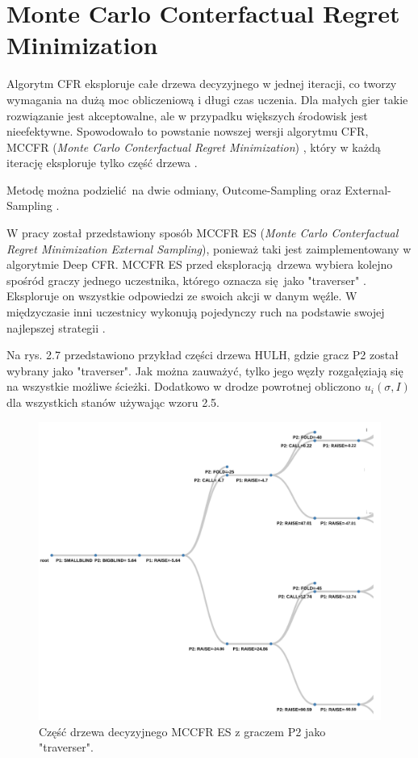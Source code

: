 \documentclass[12pt,oneside,a4paper]{report}
\begin{document}
\section{Monte Carlo Conterfactual Regret Minimization}

Algorytm CFR eksploruje całe drzewa decyzyjnego w jednej iteracji, co tworzy wymagania na
dużą moc obliczeniową i długi czas uczenia. Dla małych gier takie rozwiązanie jest akceptowalne, ale w przypadku 
większych środowisk jest nieefektywne.
Spowodowało to powstanie nowszej wersji algorytmu CFR, MCCFR (\emph{Monte Carlo Conterfactual Regret
Minimization}) , 
który w każdą iterację eksploruje tylko część drzewa \cite{mccfr}.

Metodę można podzielić na dwie odmiany, Outcome-Sampling oraz External-Sampling \cite{mccfr}.

W pracy został przedstawiony sposób MCCFR ES (\emph{Monte Carlo Conterfactual Regret
Minimization External Sampling}), ponieważ taki jest zaimplementowany w algorytmie
Deep CFR.
MCCFR ES przed eksploracją drzewa wybiera kolejno spośród graczy jednego uczestnika, którego 
oznacza
się jako "traverser" \cite{DCFR}.
Eksploruje on wszystkie odpowiedzi ze swoich akcji w danym węźle. W międzyczasie inni
uczestnicy wykonują pojedynczy ruch na podstawie swojej najlepszej strategii \cite{mccfr}.  


Na rys. 2.7 przedstawiono przykład części drzewa HULH, 
gdzie gracz P2
został wybrany jako "traverser". 
Jak można zauważyć, tylko jego węzły rozgałęziają się na wszystkie możliwe ścieżki. 
Dodatkowo w drodze powrotnej obliczono $u_{i} (\sigma, I)$ dla wszystkich
stanów używając wzoru 
2.5.


\begin{figure}[!ht]
  \centering
  \includegraphics[width=1\textwidth]{./img/tree.pdf}
  \caption{Część drzewa decyzyjnego MCCFR ES z graczem P2 jako "traverser".}
\end{figure}
\end{document}
